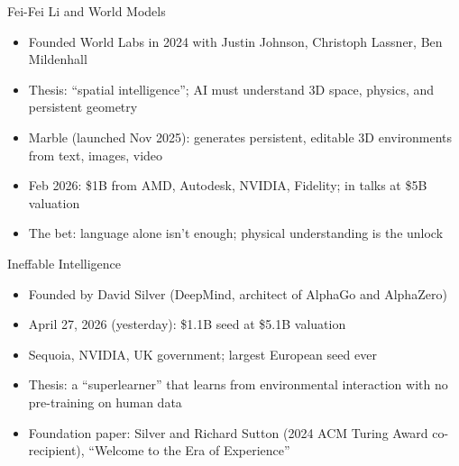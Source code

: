\documentclass[aspectratio=169]{beamer}
\begin{document}
\begin{frame}{Fei-Fei Li and World Models}
    \begin{itemize}
        \item Founded World Labs in 2024 with Justin Johnson, Christoph Lassner, Ben Mildenhall
        \vspace{0.3em}
        \item Thesis: ``spatial intelligence''; AI must understand 3D space, physics, and persistent geometry
        \vspace{0.3em}
        \item Marble (launched Nov 2025): generates persistent, editable 3D environments from text, images, video
        \vspace{0.3em}
        \item Feb 2026: \$1B from AMD, Autodesk, NVIDIA, Fidelity; in talks at \$5B valuation
        \vspace{0.3em}
        \item The bet: language alone isn't enough; physical understanding is the unlock
    \end{itemize}
\end{frame}

\begin{frame}{Ineffable Intelligence}
    \begin{itemize}
        \item Founded by David Silver (DeepMind, architect of AlphaGo and AlphaZero)
        \vspace{0.3em}
        \item April 27, 2026 (yesterday): \$1.1B seed at \$5.1B valuation
        \vspace{0.3em}
        \item Sequoia, NVIDIA, UK government; largest European seed ever
        \vspace{0.3em}
        \item Thesis: a ``superlearner'' that learns from environmental interaction with no pre-training on human data
        \vspace{0.3em}
        \item Foundation paper: Silver and Richard Sutton (2024 ACM Turing Award co-recipient), ``Welcome to the Era of Experience''
    \end{itemize}
\end{frame}
\end{document}
